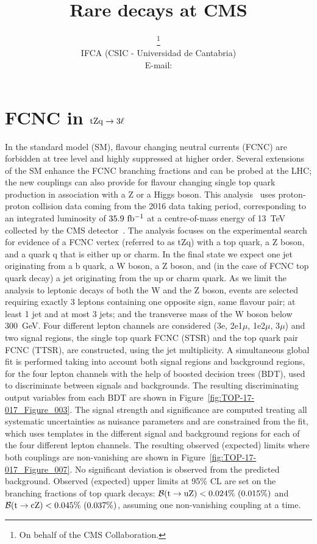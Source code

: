\documentclass{PoS}
\title{Rare decays at CMS}
\author{\speaker{J\'onatan Piedra}\thanks{On behalf of the CMS Collaboration.}\\
        IFCA (CSIC - Universidad de Cantabria)\\
        E-mail: \email{piedra@cern.ch}}
\begin{document}


\section{FCNC in ${\rm tZq \to 3\ell}$}

In the standard model (SM), flavour changing neutral currents (FCNC) are
forbidden at tree level and highly suppressed at higher order. Several
extensions of the SM enhance the FCNC branching fractions and can be probed at
the LHC; the new couplings can also provide for flavour changing single top
quark production in association with a Z or a Higgs boson.
This analysis~\cite{top-17-017} uses proton-proton collision data coming from the
2016 data taking period, corresponding to an integrated luminosity of
${\rm 35.9~fb^{-1}}$ at a centre-of-mass energy of 13~TeV collected by the CMS
detector~\cite{cms-detector}. The analysis focuses on the experimental search for evidence of a FCNC
vertex (referred to as tZq) with a top quark, a Z boson, and a quark q that is
either up or charm. In the final state we expect one jet originating from a b quark,
a W boson, a Z boson, and (in the case of FCNC top quark decay) a jet originating
from the up or charm quark. As we limit the analysis to leptonic decays of both the
W and the Z boson, events are selected requiring exactly 3 leptons containing one
opposite sign, same flavour pair; at least 1 jet and at most 3 jets; and the
transverse mass of the W boson below 300~GeV. Four different lepton channels are
considered (3e, 2e1$\mu$, 1e2$\mu$, 3$\mu$) and two signal regions, the single top
quark FCNC (STSR) and the top quark pair FCNC (TTSR), are constructed, using the
jet multiplicity. A simultaneous global fit is performed taking into account
both signal regions and background regions, for the four lepton channels with the
help of boosted decision trees (BDT), used to discriminate between signals and
backgrounds. The resulting discriminating output variables from each BDT are
shown in Figure~\ref{fig:TOP-17-017_Figure_003}. The signal strength and significance
are computed treating all systematic uncertainties as nuisance parameters and are
constrained from the fit, which uses templates in the different signal and
background regions for each of the four different lepton channels. The resulting
observed (expected) limits where both couplings are non-vanishing are shown in
Figure~\ref{fig:TOP-17-017_Figure_007}. No significant deviation is observed from
the predicted background. Observed (expected) upper limits at 95\% CL are set on
the branching fractions of top quark decays:
${\cal B}({\rm t \to uZ}) < 0.024\%~(0.015\%)$ and
${\cal B}({\rm t \to cZ}) < 0.045\%~(0.037\%)$, assuming one non-vanishing
coupling at a time.
\end{document}

